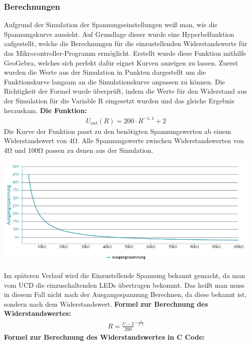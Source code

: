 \documentclass[paper=a4, 12pt]{scrreprt}
\begin{document}
			\subsubsection{Berechnungen}\hfill \break
			\label{sec:berechnungen}
			Aufgrund der Simulation der Spannungseinstellungen weiß man, wie die Spannungskurve aussieht. Auf Grundlage dieser wurde eine Hyperbelfunktion aufgestellt, welche die Berechnungen für die einzustellenden Widerstandswerte für das Mikrocontroller-Programm ermöglicht. \hfill \break
			Erstellt wurde diese Funktion mithilfe GeoGebra, welches sich perfekt dafür eignet Kurven anzeigen zu lassen. Zuerst wurden die Werte aus der Simulation in Punkten dargestellt um die Funktionskurve langsam an die Simulationskurve anpassen zu können. \hfill \break
			Die Richtigkeit der Formel wurde überprüft, indem die Werte für den Widerstand aus der Simulation für die Variable R eingesetzt wurden und das gleiche Ergebnis herauskam. \hfill \break \hfill \break
			\textbf{Die Funktion:} 
			\begin{align*} 
			U_{out}(R) = 200 \cdot R^{-1,1} + 2
			\end{align*}
			Die Kurve der Funktion passt zu den benötigten Spannungswerten ab einem Widerstandswert von 4Ω. Alle Spannungswerte zwischen Widerstandswerten von 4Ω und 100Ω passen zu denen aus der Simulation.
			\begin{adjustbox}{center,caption={Berechneter Spannungsverlauf bei Widerstandsänderung},label={fig:berechnungSPG},nofloat=figure,vspace=\bigskipamount}
				\includegraphics[width=\textwidth]{img/berechnungSPG.PNG}
			\end{adjustbox}
			Im späteren Verlauf wird die Einzustellende Spannung bekannt gemacht, da man vom UCD die einzuschaltenden LEDs übertragen bekommt. Das heißt man muss in diesem Fall nicht nach der Ausgangsspannung Berechnen, da diese bekannt ist, sondern nach dem Widerstandswert. \hfill \break \hfill \break
			\textbf{Formel zur Berechnung des Widerstandswertes:}
			\begin{align*} 
			R=\frac{ U - 2 }{ 200 }^{ -\frac{ 1 }{ 1,1 } }
			\end{align*}
			\textbf{Formel zur Berechnung des Widerstandswertes in C Code:}
			
			 
\end{document}
